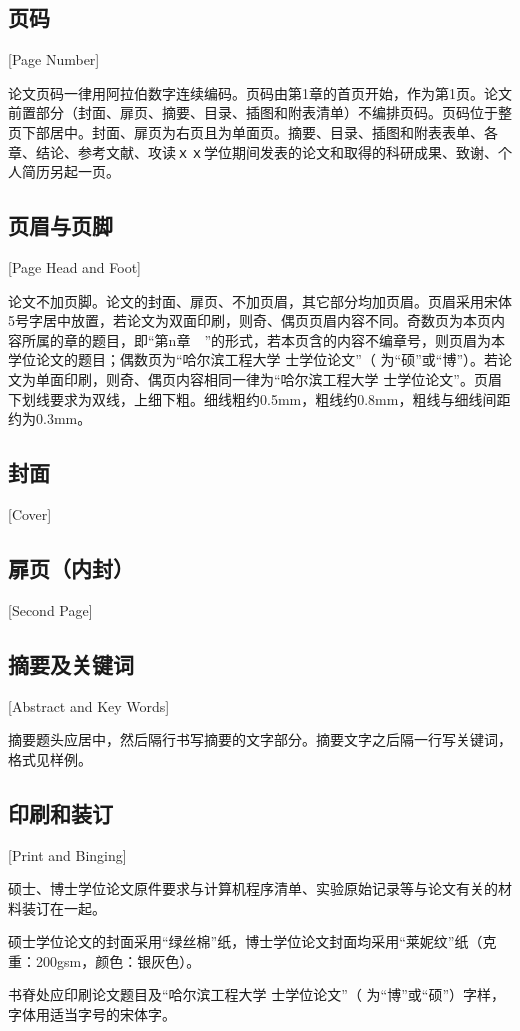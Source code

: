 \subsection{页码}[Page Number]

论文页码一律用阿拉伯数字连续编码。页码由第1章的首页开始，作为第1页。论文前置部分（封面、扉页、摘要、目录、插图和附表清单）不编排页码。页码位于整页下部居中。封面、扉页为右页且为单面页。摘要、目录、插图和附表表单、各章、结论、参考文献、攻读ｘｘ学位期间发表的论文和取得的科研成果、致谢、个人简历另起一页。

\subsection{页眉与页脚}[Page Head and Foot]

论文不加页脚。论文的封面、扉页、不加页眉，其它部分均加页眉。页眉采用宋体5号字居中放置，若论文为双面印刷，则奇、偶页页眉内容不同。奇数页为本页内容所属的章的题目，即“第n章　”的形式，若本页含的内容不编章号，则页眉为本学位论文的题目；偶数页为“哈尔滨工程大学 \underline{\hspace{1em}} 士学位论文”（ \underline{\hspace{1em}} 为“硕”或“博”）。若论文为单面印刷，则奇、偶页内容相同一律为“哈尔滨工程大学 \underline{\hspace{1em}} 士学位论文”。页眉下划线要求为双线，上细下粗。细线粗约0.5mm，粗线约0.8mm，粗线与细线间距约为0.3mm。

\subsection{封面}[Cover]


\subsection{扉页（内封）}[Second Page]


\subsection{摘要及关键词}[Abstract and Key Words]

摘要题头应居中，然后隔行书写摘要的文字部分。摘要文字之后隔一行写关键词，格式见样例。

\subsection{印刷和装订}[Print and Binging]

硕士、博士学位论文原件要求与计算机程序清单、实验原始记录等与论文有关的材料装订在一起。

硕士学位论文的封面采用“绿丝棉”纸，博士学位论文封面均采用“莱妮纹”纸（克重：200gsm，颜色：银灰色）。

书脊处应印刷论文题目及“哈尔滨工程大学 \underline{\hspace{1em}} 士学位论文”（\underline{\hspace{1em}} 为“博”或“硕”）字样，字体用适当字号的宋体字。



